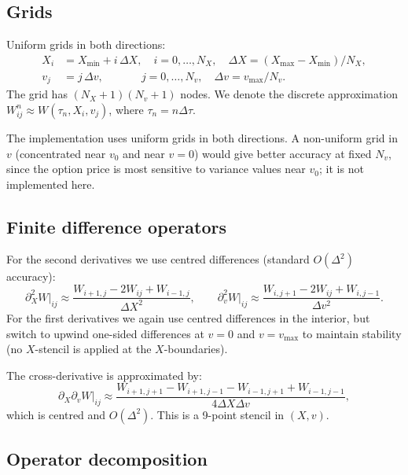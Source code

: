 \documentclass[11pt]{article}
\theoremstyle{plain}
\theoremstyle{definition}
\theoremstyle{remark}
\begin{document}
\subsection{Grids}

Uniform grids in both directions:
\begin{align*}
    X_i &= X_{\min} + i\, \Delta X, \quad i = 0, \ldots, N_X, \quad \Delta X = (X_{\max} - X_{\min}) / N_X, \\
    v_j &= j\, \Delta v, \qquad\quad\;\, j = 0, \ldots, N_v, \quad \Delta v = v_{\max} / N_v.
\end{align*}
The grid has $(N_X + 1)(N_v + 1)$ nodes. We denote the discrete approximation $W^n_{ij} \approx W(\tau_n, X_i, v_j)$, where $\tau_n = n \Delta\tau$.

The implementation uses uniform grids in both directions. A non-uniform grid in $v$ (concentrated near $v_0$ and near $v = 0$) would give better accuracy at fixed $N_v$, since the option price is most sensitive to variance values near $v_0$; it is not implemented here.

\subsection{Finite difference operators}

For the second derivatives we use centred differences (standard $O(\Delta^2)$ accuracy):
\[
    \partial^2_X W \bigr|_{ij} \approx \frac{W_{i+1,j} - 2 W_{ij} + W_{i-1,j}}{\Delta X^2}, \qquad
    \partial^2_v W \bigr|_{ij} \approx \frac{W_{i,j+1} - 2 W_{ij} + W_{i,j-1}}{\Delta v^2}.
\]
For the first derivatives we again use centred differences in the interior, but switch to upwind one-sided differences at $v = 0$ and $v = v_{\max}$ to maintain stability (no $X$-stencil is applied at the $X$-boundaries).

The cross-derivative is approximated by:
\[
    \partial_X \partial_v W \bigr|_{ij} \approx \frac{W_{i+1,j+1} - W_{i+1,j-1} - W_{i-1,j+1} + W_{i-1,j-1}}{4 \Delta X \Delta v},
\]
which is centred and $O(\Delta^2)$. This is a 9-point stencil in $(X, v)$.

\subsection{Operator decomposition}
\end{document}
